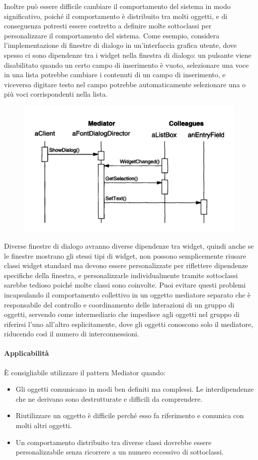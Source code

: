 Inoltre può essere difficile cambiare il comportamento del sistema in modo significativo, poiché il comportamento è distribuito tra molti oggetti, e di conseguenza potresti essere costretto a definire molte sottoclassi per personalizzare il comportamento del sistema. Come esempio, considera l'implementazione di finestre di dialogo in un'interfaccia grafica utente, dove spesso ci sono dipendenze tra i widget nella finestra di dialogo: un pulsante viene disabilitato quando un certo campo di inserimento è vuoto, selezionare una voce in una lista potrebbe cambiare i contenuti di un campo di inserimento, e viceversa digitare testo nel campo potrebbe automaticamente selezionare una o più voci corrispondenti nella lista.

\begin{figure}[H]
    \centering
    \includegraphics[width=0.75\linewidth]{assets/pattern/mediator/mediator-esempio-sequence.png}
\end{figure}

Diverse finestre di dialogo avranno diverse dipendenze tra widget, quindi anche se le finestre mostrano gli stessi tipi di widget, non possono semplicemente riusare classi widget standard ma devono essere personalizzate per riflettere dipendenze specifiche della finestra, e personalizzarle individualmente tramite sottoclassi sarebbe tedioso poiché molte classi sono coinvolte. Puoi evitare questi problemi incapsulando il comportamento collettivo in un oggetto mediatore separato che è responsabile del controllo e coordinamento delle interazioni di un gruppo di oggetti, servendo come intermediario che impedisce agli oggetti nel gruppo di riferirsi l'uno all'altro esplicitamente, dove gli oggetti conoscono solo il mediatore, riducendo così il numero di interconnessioni.

\paragraph{Applicabilità} È consigliabile utilizzare il pattern Mediator quando:
\begin{itemize}
    \item Gli oggetti comunicano in modi ben definiti ma complessi. Le interdipendenze che ne derivano sono destrutturate e difficili da comprendere.
    \item Riutilizzare un oggetto è difficile perché esso fa riferimento e comunica con molti altri oggetti.
    \item Un comportamento distribuito tra diverse classi dovrebbe essere personalizzabile senza ricorrere a un numero eccessivo di sottoclassi.
\end{itemize}

